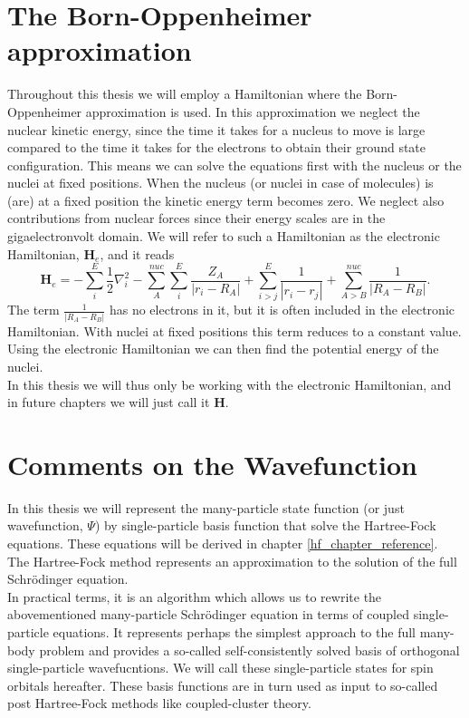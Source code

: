 \documentclass[a4paper,norsk,11pt,twoside]{report}
\begin{document}
\section{The Born-Oppenheimer approximation}
Throughout this thesis we will employ a Hamiltonian where the
Born-Oppenheimer approximation is used.  In this approximation we
neglect the nuclear kinetic energy, since the time it takes for a
nucleus to move is large compared to the time it takes for the
electrons to obtain their ground state configuration. This means we
can solve the equations first with the nucleus or the nuclei at fixed
positions. When the nucleus (or nuclei in case of molecules) is (are)
at a fixed position the kinetic energy term becomes zero. We neglect
also contributions from nuclear forces since their energy scales are
in the gigaelectronvolt domain. We will refer to such a Hamiltonian as
the electronic Hamiltonian, $\textbf{H}_e$, and it reads
\begin{equation}
\textbf{H}_e = - \sum_i^E \frac{1}{2} \nabla_i^2
- \sum_A^{nuc} \sum_i^E \frac{Z_A}{|r_i - R_A|}
+ \sum_{i>j}^E \frac{1}{|r_i - r_j|}
+ \sum_{A>B}^{nuc} \frac{1}{|R_A - R_B|}.
\end{equation}
The term $\frac{1}{|R_A - R_B|}$ has no electrons in it, but it is
often included in the electronic Hamiltonian. With nuclei at fixed
positions this term reduces to a constant value. Using the
electronic Hamiltonian we can then find the potential energy of the
nuclei. \\

In this thesis we will thus only be working with the electronic
Hamiltonian, and in future chapters we will just call it $\textbf{H}$.

\section{Comments on the Wavefunction}
In this thesis we will represent the many-particle state function (or just wavefunction, $\Psi$) by single-particle basis function that solve the Hartree-Fock equations. These equations will be derived in chapter \ref{hf_chapter_reference}. The Hartree-Fock method represents an
approximation to the solution of the full Schr\"odinger equation. \\

In
practical terms, it is an algorithm which allows us to rewrite the abovementioned many-particle Schr\"odinger 
equation in terms of coupled single-particle equations. It represents perhaps the simplest approach to the 
full many-body problem and provides a so-called self-consistently solved  basis of orthogonal single-particle wavefucntions. We will call these single-particle states for spin orbitals hereafter. 
These basis functions are in turn used as input to so-called post Hartree-Fock methods like coupled-cluster theory. \\
\end{document}
